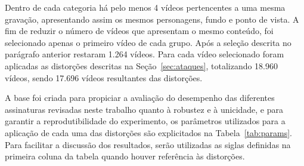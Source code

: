 
Dentro de cada categoria há pelo menos 4 vídeos pertencentes a uma mesma gravação, apresentando assim os mesmos personagens, fundo e ponto de vista. A fim de reduzir o número de vídeos que apresentam o mesmo conteúdo, foi selecionado apenas o primeiro vídeo de cada grupo. Após a seleção descrita no parágrafo anterior restaram 1.264 vídeos. Para cada vídeo selecionado foram aplicadas as distorções descritas na Seção~\ref{sec:ataques}, totalizando 18.960 vídeos, sendo 17.696 vídeos resultantes das distorções.


A base foi criada para propiciar a avaliação do desempenho das diferentes assinaturas revisadas neste trabalho quanto à robustez e à unicidade, e para garantir a reprodutibilidade do experimento, os parâmetros utilizados para a aplicação de cada uma das distorções são explicitados na Tabela~\ref{tab:params}. Para facilitar a discussão dos resultados, serão utilizadas as siglas definidas na primeira coluna da tabela quando houver referência às distorções.

